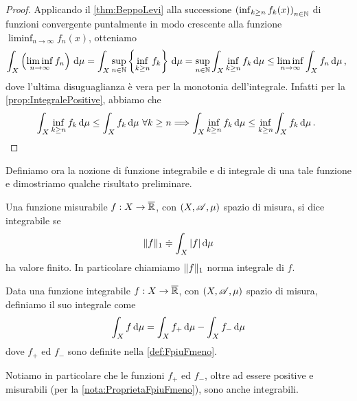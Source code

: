 \begin{proof}
	Applicando il \cref{thm:BeppoLevi} alla successione $\left(\inf_{k\ge n}f_k(x)\right)_{n\in\mathbb N}$ di funzioni convergente puntalmente in modo crescente alla funzione $\liminf_{n\to\infty}f_n(x)$, otteniamo
	\begin{equation*}
		\int_X\left(\liminf_{n\to\infty}f_n\right)\,\mathrm d\mu=\int_X \sup_{n\in\mathbb N}\left\{\inf_{k\ge n}f_k\right\}\,\mathrm d\mu=\sup_{n\in\mathbb N}\int_X \inf_{k\ge n}f_k\,\mathrm d\mu\le \liminf_{n\to\infty}\int_Xf_n\,\mathrm d\mu\, \text{, }
	\end{equation*}
	dove l'ultima disuguaglianza è vera per la monotonia dell'integrale. Infatti per la \cref{prop:IntegralePositive}, abbiamo che
	\begin{equation*}
		\int_X \inf_{k\ge n}f_k\,\mathrm d\mu\le \int_Xf_k\,\mathrm d\mu \ \forall k\ge n \Longrightarrow \int_X \inf_{k\ge n}f_k\,\mathrm d\mu\le \inf_{k\ge n}\int_Xf_k\,\mathrm d\mu\, \text{. }
	\end{equation*}
\end{proof}

Definiamo ora la nozione di funzione integrabile e di integrale di una tale funzione e dimostriamo qualche risultato preliminare.

\begin{definition}
	Una funzione misurabile $f:X\to\overline{\mathbb R}$, con $(X,\mathscr A,\mu)$ spazio di misura, si dice integrabile se 
	\begin{equation*}
		\Vert f\Vert_1\doteqdot \int_X |f|\,\mathrm d\mu
	\end{equation*}
	ha valore finito. In particolare chiamiamo $\Vert f\Vert_1$ norma integrale di $f$.
	
\end{definition}

\begin{definition}\label{def:IntegraleIntegrabili}
	Data una funzione integrabile $f:X\to\overline{\mathbb R}$, con $(X,\mathscr A,\mu)$ spazio di misura, definiamo il suo integrale come
	\begin{equation*}
		\int_X f\,\mathrm d\mu=\int_Xf_+\,\mathrm d\mu-\int_Xf_-\,\mathrm d\mu
	\end{equation*}
	dove $f_+$ ed $f_-$ sono definite nella \cref{def:FpiuFmeno}.
\end{definition}

\begin{remark}\label{nota:FpiuFmenoIntegrabili}
	Notiamo in particolare che le funzioni $f_+$ ed $f_-$, oltre ad essere positive e misurabili (per la \cref{nota:ProprietaFpiuFmeno}), sono anche integrabili.
\end{remark}

